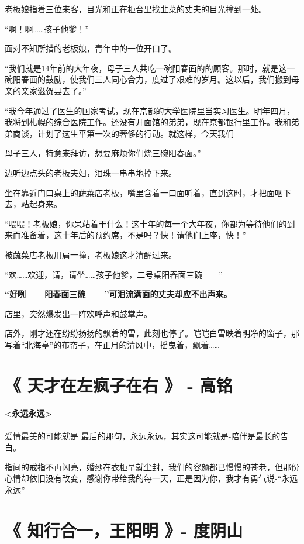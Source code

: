 \documentclass[UTF8,a4paper,8pt]{ctexbook}
\begin{document}
			  老板娘指着三位来客，目光和正在柜台里找韭菜的丈夫的目光撞到一处。
			  
			  “啊！啊……孩子他爹！”
			  
			  面对不知所措的老板娘，青年中的一位开口了。
			  
			  “我们就是14年前的大年夜，母子三人共吃一碗阳春面的的顾客。那时，就是这一碗阳春面的鼓励，使我们三人同心合力，度过了艰难的岁月。这以后，我们搬到母亲的亲家滋贺县去了。”
			  
			  “我今年通过了医生的国家考试，现在京都的大学医院里当实习医生。明年四月，我将到札幌的综合医院工作。还没有开面馆的弟弟，现在京都银行里工作。我和弟弟商谈，计划了这生平第一次的奢侈的行动。就这样，今天我们
			  
			  母子三人，特意来拜访，想要麻烦你们烧三碗阳春面。”
			  
			  边听边点头的老板夫妇，泪珠一串串地掉下来。
			  
			  坐在靠近门口桌上的蔬菜店老板，嘴里含着一口面听着，直到这时，才把面咽下去，站起身来。
			  
			  “喂喂！老板娘，你呆站着干什么！这十年的每一个大年夜，你都为等待他们的到来而准备着，这十年后的预约席，不是吗？快！请他们上座，快！”
			  
			  被蔬菜店老板用肩一撞，老板娘这才清醒过来。
			  
			  “欢……欢迎，请，请坐……孩子他爹，二号桌阳春面三碗——”
			  
			 \textbf{ “好咧——阳春面三碗——”可泪流满面的丈夫却应不出声来。}
			  
			  店里，突然爆发出一阵欢呼声和鼓掌声。
			  
			  店外，刚才还在纷纷扬扬的飘着的雪，此刻也停了。皑皑白雪映着明净的窗子，那写着“北海亭”的布帘子，在正月的清风中，摇曳着，飘着……
			  
	      \newpage
     \section{《 天才在左疯子在右 》 - 高铭}
		\paragraph{<永远永远>}爱情最美的可能就是 最后的那句，永远永远，其实这可能就是-陪伴是最长的告白。
		
		指间的戒指不再闪亮，婚纱在衣柜早就尘封，我们的容颜都已慢慢的苍老，但那份心情却依旧没有改变，感谢你带给我的每一天，正是因为你，我才有勇气说-“永远永远”
	  	 \newpage
	 \section{《 知行合一，王阳明 》- 度阴山}
\end{document}
